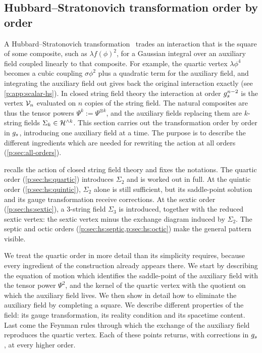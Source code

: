 \subsection{Hubbard–Stratonovich transformation order by order}
\label{p:sec:hs}

A Hubbard--Stratonovich transformation~\cite{Stratonovich:1957:MethodCalculatingQuantum,Hubbard:1959:CalculationPartitionFunctions} trades an interaction that is the square of some composite, such as $\lambda f(\phi)^2$, for a Gaussian integral over an auxiliary field coupled linearly to that composite.
For example, the quartic vertex $\lambda \phi^4$ becomes a cubic coupling $\sigma \phi^2$ plus a quadratic term for the auxiliary field, and integrating the auxiliary field out gives back the original interaction exactly (see \cref{p:app:scalar-hs}).
In closed string field theory the interaction at order $g_s^{n-2}$ is the vertex $\mathcal{V}_{n}$ evaluated on $n$ copies of the string field.
The natural composites are thus the tensor powers $\Psi^k := \Psi^{\otimes k}$, and the auxiliary fields replacing them are $k$-string fields $\Sigma_k \in \mathcal{H}^{\wedge k}$.
This section carries out the transformation order by order in $g_s$, introducing one auxiliary field at a time.
The purpose is to describe the different ingredients which are needed for rewriting the action at all orders (\cref{p:sec:all-orders}).

 recalls the action of closed string field theory and fixes the notations.
The quartic order (\cref{p:sec:hs:quartic}) introduces $\Sigma_2$ and is worked out in full.
At the quintic order (\cref{p:sec:hs:quintic}), $\Sigma_2$ alone is still sufficient, but its saddle-point solution and its gauge transformation receive corrections.
At the sextic order (\cref{p:sec:hs:sextic}), a $3$-string field $\Sigma_3$ is introduced, together with the reduced sextic vertex: the sextic vertex minus the exchange diagram induced by $\Sigma_2$.
The septic and octic orders (\cref{p:sec:hs:septic,p:sec:hs:octic}) make the general pattern visible.

We treat the quartic order in more detail than its simplicity requires, because every ingredient of the construction already appears there.
We start by describing the equation of motion which identifies the saddle-point of the auxiliary field with the tensor power $\Psi^2$, and the kernel of the quartic vertex with the quotient on which the auxiliary field lives.
We then show in detail how to eliminate the auxiliary field by completing a square.
We describe different properties of the field: its gauge transformation, its reality condition and its spacetime content.
Last come the Feynman rules through which the exchange of the auxiliary field reproduces the quartic vertex.
Each of these points returns, with corrections in $g_s$, at every higher order.

